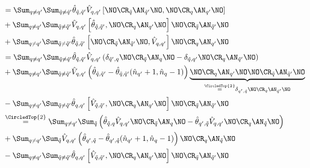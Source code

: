 \begin{appendix}
\begin{itemize}
\begin{align}
&=\Sum_{q\neq q^\prime}\Sum_{\tilde q\neq\tilde q^\prime} \hat\theta_{\tilde q,\tilde q^\prime}\hat V_{q,q^\prime}\left[\NO\CR_{\tilde q}\AN_{\tilde q^\prime}\NO,\NO\CR_q\AN_{q^\prime}\NO\right] \nonumber \\
&+\Sum_{q\neq q^\prime}\Sum_{\tilde q\neq\tilde q^\prime} \hat V_{q,q^\prime}\left[\hat\theta_{\tilde q,\tilde q^\prime},\NO\CR_q\AN_{q^\prime}\NO\right]\NO\CR_{\tilde q}\AN_{\tilde q^\prime}\NO\nonumber \\
&+\Sum_{q\neq q^\prime}\Sum_{\tilde q\neq\tilde q^\prime} \hat\theta_{\tilde q,\tilde q^\prime}\left[\NO\CR_{\tilde q}\AN_{\tilde q^\prime}\NO,\hat V_{q,q^\prime}\right]\NO\CR_q\AN_{q^\prime}\NO\nonumber \\
&=\Sum_{q\neq q^\prime}\Sum_{\tilde q\neq\tilde q^\prime} \hat\theta_{\tilde q,\tilde q^\prime}\hat V_{q,q^\prime}\left(\delta_{\tilde q^\prime,q}\NO\CR_{\tilde q}\AN_q\NO-\delta_{\tilde q,q^\prime}\NO\CR_q\AN_{\tilde q^\prime}\NO\right) \\
&+\Sum_{q\neq q^\prime}\Sum_{\tilde q\neq\tilde q^\prime} \hat V_{q,q^\prime}\left(\hat\theta_{\tilde q,\tilde q^\prime}-\hat\theta_{\tilde q,\tilde q^\prime}(\hat n_{q^\prime}+1,\hat n_q-1)\right)\underbrace{\NO\CR_q\AN_{q^\prime}\NO\NO\CR_{\tilde q}\AN_{\tilde q^\prime}\NO}_{\overset{\CircledTop{2}}{=}\delta_{q^\prime,\tilde q}\NO\CR_{q}\AN_{\tilde q^\prime}\NO}\nonumber \\
&-\Sum_{q\neq q^\prime}\Sum_{\tilde q\neq\tilde q^\prime} \hat\theta_{q,q^\prime}\left[\hat V_{\tilde q,\tilde q^\prime},\NO\CR_q\AN_{q^\prime}\NO\right]\NO\CR_{\tilde q}\AN_{\tilde q^\prime}\NO\nonumber \\
&\overset{\CircledTop{2}}{=}\Sum_{q\neq q^\prime}\Sum_{\tilde q} \left(\hat\theta_{\tilde q,q}\hat V_{q,q^\prime}\NO\CR_{\tilde q}\AN_q\NO-\hat\theta_{q^\prime,\tilde q}\hat V_{q,q^\prime}\NO\CR_{q}\AN_{\tilde q}\NO\right) \nonumber \\
&+\Sum_{q\neq q^\prime}\Sum_{\tilde q} \hat V_{q,q^\prime}\left(\hat\theta_{q^\prime,\tilde q}-\hat\theta_{q^\prime,\tilde q}(\hat n_{q^\prime}+1,\hat n_q-1)\right)\NO\CR_{q}\AN_{\tilde q}\NO\nonumber \\
&-\Sum_{q\neq q^\prime}\Sum_{\tilde q\neq\tilde q^\prime} \hat\theta_{q,q^\prime}\left[\hat V_{\tilde q,\tilde q^\prime},\NO\CR_q\AN_{q^\prime}\NO\right]\NO\CR_{\tilde q}\AN_{\tilde q^\prime}\NO\nonumber \\

\end{align}
\end{itemize}
\end{appendix}

